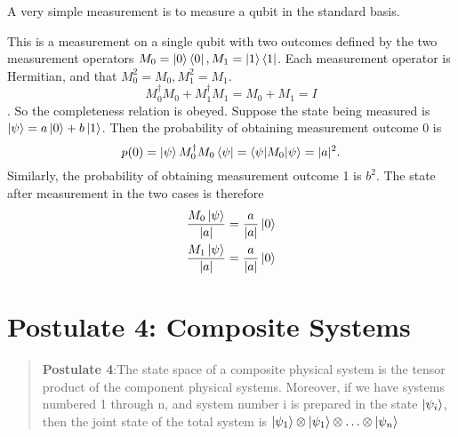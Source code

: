 
A very simple measurement is to measure a qubit in the standard basis. 

\begin{example} 
This is a measurement on a single qubit with two outcomes defined by the two measurement operators $M_0=\ket{0}\bra{0}, M_1=\ket{1}\bra{1}$. Each measurement operator is Hermitian, and that $M_0^2=M_0, M_1^2=M_1$. 
\begin{equation*}
    M_0^\dagger M_0+M_1^\dagger M_1 = M_0 + M_1 = I
\end{equation*}.
So the completeness relation is obeyed. Suppose the state being measured is $\ket{\psi}=a\ket{0}+b\ket{1}$. Then the probability of obtaining measurement outcome 0 is
\begin{equation*}
    p(0) = \ket{\psi}M_0^\dagger M_0 \bra{\psi} = \braket{\psi | M_0 | \psi}=|a|^2.
\end{equation*}
Similarly, the probability of obtaining measurement outcome 1 is $b^2$.
The state after measurement in the two cases is therefore
\begin{gather*}
    \frac{M_0 \ket{\psi}}{|a|}=\frac{a}{|a|}\ket{0}\\
    \frac{M_1 \ket{\psi}}{|a|}=\frac{a}{|a|}\ket{0}\\   
\end{gather*}
\end{example}

\begin{example}

\end{example}

\section{Postulate 4: Composite Systems}
\begin{quote}
    \textbf{Postulate 4}:The state space of a composite physical system is the tensor product of the component physical systems. Moreover, if we have systems numbered 1 through n, and system number i is prepared in the state $\ket{\psi_i}$, then the joint state of the total system is $\ket{\psi_1} \otimes \ket{\psi_1} \otimes \hdots \otimes \ket{\psi_n}$
\end{quote}

